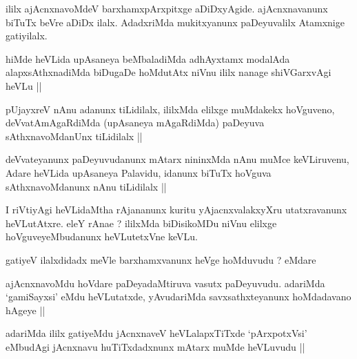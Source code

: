 \begin{artha}
ililx ajAcnxnavoMdeV barxhamxpArxpitxge aDiDxyAgide. ajAcnxnavanunx biTuTx beVre aDiDx ilalx. AdadxriMda mukitxyanunx paDeyuvalilx Atamxnige gatiyilalx.
\end{artha}


\begin{artha}
hiMde heVLida upAsaneya beMbaladiMda adhAyxtamx modalAda alapxsAthxnadiMda biDugaDe hoMdutAtx niVnu ililx nanage shiVGarxvAgi heVLu ||
\end{artha}


\begin{artha}
pUjayxreV nAnu adanunx tiLidilalx, ililxMda elilxge muMdakekx hoVguveno, deVvatAmAgaRdiMda (upAsaneya mAgaRdiMda) paDeyuva sAthxnavoMdanUnx tiLidilalx ||
\end{artha}

\begin{artha}
deVvateyanunx paDeyuvudanunx mAtarx nininxMda nAnu muMce keVLiruvenu, Adare heVLida upAsaneya Palavidu, idanunx biTuTx hoVguva sAthxnavoMdanunx nAnu tiLidilalx ||
\end{artha}


\begin{artha}
I riVtiyAgi heVLidaMtha rAjananunx kuritu yAjacnxvalakxyXru utatxravanunx heVLutAtxre. eleY rAnae ? ililxMda biDisikoMDu niVnu elilxge hoVguveyeMbudanunx heVLutetxVne keVLu.
\end{artha}

\begin{artha}
gatiyeV ilalxdidadx meVle barxhamxvanunx heVge hoMduvudu ? eMdare
\end{artha}

\begin{artha}
ajAcnxnavoMdu hoVdare paDeyadaMtiruva vasutx paDeyuvudu. adariMda `gamiSayxsi' eMdu heVLutatxde, yAvudariMda savxsathxteyanunx hoMdadavano hAgeye ||
\end{artha}

\begin{artha}
adariMda ililx gatiyeMdu jAcnxnaveV heVLalapxTiTxde `pArxpotxVsi' eMbudAgi jAcnxnavu huTiTxdadxnunx mAtarx muMde heVLuvudu ||
\end{artha}


